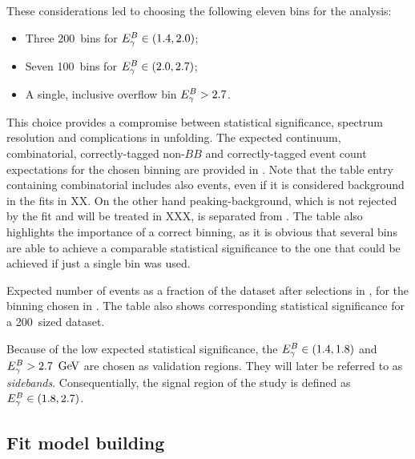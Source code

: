 These considerations led to choosing the following eleven \EB bins for the analysis:
\begin{itemize}
    \item Three 200~\mev bins for ${E^B_{\gamma}}\in(1.4,2.0)$;
    \item Seven 100~\mev bins for ${E^B_{\gamma}}\in(2.0,2.7)$;
    \item A single, inclusive overflow bin ${E^B_{\gamma}}>2.7$.
\end{itemize}
This choice provides a compromise between statistical significance, \EB spectrum resolution and complications in unfolding.
The expected continuum, combinatorial, correctly-tagged non-\BtoXsgamma $BB$ and correctly-tagged \BtoXsgamma event count expectations for the chosen binning are provided in .
Note that the table entry containing combinatorial \BB includes also \BtoXsgamma events, even if it is considered background in the \Mbc fits in XX.
On the other hand peaking-\BB background, which is not rejected by the \Mbc fit and will be treated in XXX, is separated from \BtoXsgamma.
The table also highlights the importance of a correct binning, as it is obvious that several bins are able to achieve a comparable statistical significance to the one that could be achieved if just a single bin was used.

\begin{table}[htbp!]
    \caption{\label{tab:expected_events}Expected number of events as a fraction of the dataset after selections in , for the binning chosen in .
    The table also shows corresponding statistical significance for a 200~\invfb sized dataset.
    }
    
\end{table}

Because of the low expected statistical significance, the ${E^B_{\gamma}}\in(1.4,1.8)$ and ${E^B_{\gamma}}>2.7~\mathrm{\,Ge\kern -0.1em V}$ are chosen as validation regions.
They will later be referred to as \textit{sidebands}.
Consequentially, the signal region of the study is defined as ${E^B_{\gamma}}\in(1.8,2.7)$.


\subsection{Fit model building}\label{sec:fitting_setup}

